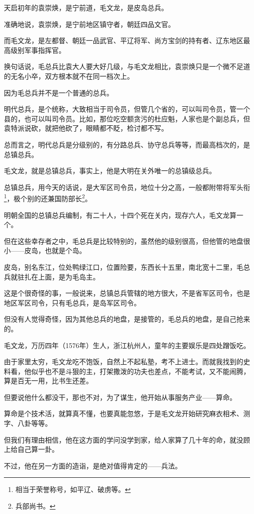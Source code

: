 \begin{multicols}{\theparacolNo}
天启初年的袁崇焕，是宁前道，毛文龙，是皮岛总兵。

准确地说，袁崇焕，是宁前地区镇守者，朝廷四品文官。

而毛文龙，是左都督、朝廷一品武官、平辽将军、尚方宝剑的持有者、辽东地区最高级别军事指挥官。

换句话说，毛总兵比袁大人要大好几级，与毛文龙相比，袁崇焕只是一个微不足道的无名小卒，双方根本就不在同一档次上。

因为毛总兵并不是一个普通的总兵。

明代总兵，是个统称，大致相当于司令员，但管几个省的，可以叫司令员，管一个县的，也可以叫司令员。比如，那位吃空额贪污的杜应魁，人家也是个副总兵，但袁特派说砍，就把他砍了，眼睛都不眨，检讨都不写。

总而言之，明代总兵是分级别的，有分路总兵、协守总兵等等，而最高档次的，是总镇总兵。

毛文龙，就是总镇总兵，事实上，他是大明在关外唯一的总镇级总兵。

总镇总兵，用今天的话说，是大军区司令员，地位十分之高，一般都附带将军头衔\footnote{相当于荣誉称号，如平辽、破虏等。}，极个别的还兼国防部长\footnote{兵部尚书。}。

明朝全国的总镇总兵编制，有二十人，十四个死在关内，现存六人，毛文龙算一个。

但在这些幸存者之中，毛总兵是比较特别的，虽然他的级别很高，但他管的地盘很小——皮岛，也就是个岛。

皮岛，别名东江，位处鸭绿江口，位置险要，东西长十五里，南北宽十二里，毛总兵就驻扎在上面，是为毛岛主。

这是个很奇怪的事，一般说来，总镇总兵管辖的地方很大，不是省军区司令，也是地区军区司令，只有毛总兵，是岛军区司令。

但没有人觉得奇怪，因为其他总兵的地盘，是接管的，毛总兵的地盘，是自己抢来的。

毛文龙，万历四年（1576年）生人，浙江杭州人，童年的主要娱乐是四处蹭饭吃。

由于家里太穷，毛文龙吃不饱饭，自然上不起私塾，考不上进士。而就我找到的史料看，他似乎也不是斗狠的主，打架撒泼的功夫也差点，不能考试，又不能闹腾，算是百无一用，比书生还差。

但要说他什么都没干，那也不对，为了谋生，他开始从事服务产业——算命。

算命是个技术活，就算真不懂，也要真能忽悠，于是毛文龙开始研究麻衣相术、测字、八卦等等。

但我们有理由相信，他在这方面的学问没学到家，给人家算了几十年的命，就没顾上给自己算一卦。

不过，他在另一方面的造诣，是绝对值得肯定的——兵法。


\end{multicols}
